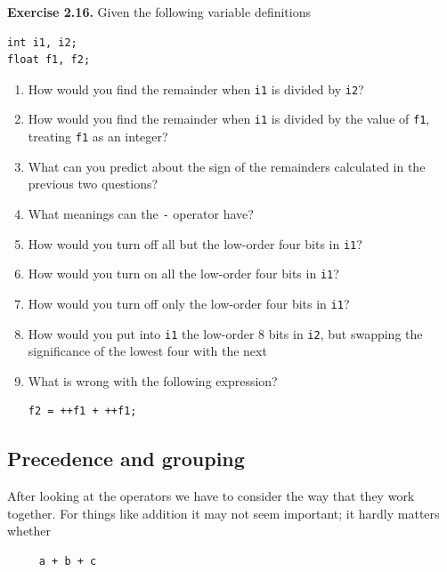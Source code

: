    

   

    \textbf{Exercise 2.16.} Given the following variable definitions

\begin{Verbatim}
int i1, i2;
float f1, f2;
\end{Verbatim}
\begin{enumerate}
      \item How would you find the remainder when \texttt{i1} is
       divided by \texttt{i2}?
      \item How would you find the remainder when \texttt{i1} is
       divided by the value of \texttt{f1},
       treating \texttt{f1} as an integer?
      \item What can you predict about the sign of the remainders calculated in
       the previous two questions?
      \item What meanings can the \texttt{-} operator have?
      \item How would you turn off all but the low-order four bits
       in \texttt{i1}?
      \item How would you turn on all the low-order four bits
       in \texttt{i1}?
      \item How would you turn off only the low-order four bits
       in \texttt{i1}?
      \item How would you put into \texttt{i1} the low-order
       8 bits in \texttt{i2}, but swapping the significance of
       the lowest four with the next
      \item What is wrong with the following expression?
       \begin{Verbatim}
f2 = ++f1 + ++f1;
\end{Verbatim}

      
     \end{enumerate}

   

  

  \subsection{Precedence and grouping}\label{subsec:precGrp}
   

   After looking at the operators we have to consider the way that they
    work together. For things like addition it may not seem important; it
    hardly matters whether


   \begin{Verbatim}
     a + b + c
   \end{Verbatim}


